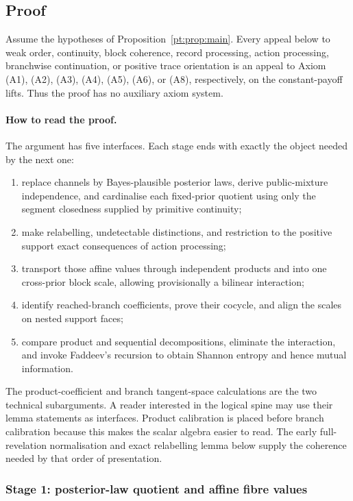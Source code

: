 \subsection{Proof}

Assume the hypotheses of Proposition~\ref{pt:prop:main}.  Every appeal below
to weak order, continuity, block coherence, record processing, action
processing, branchwise continuation, or positive trace orientation is an
appeal to Axiom \textup{(A1)}, \textup{(A2)}, \textup{(A3)}, \textup{(A4)},
\textup{(A5)}, \textup{(A6)}, or \textup{(A8)}, respectively, on the
constant-payoff lifts.  Thus the proof has no auxiliary axiom system.

\paragraph{How to read the proof.}
The argument has five interfaces.  Each stage ends with exactly the object
needed by the next one:
\begin{enumerate}[label=\textup{Stage \arabic*:},leftmargin=*]
\item replace channels by Bayes-plausible posterior laws, derive public-mixture
  independence, and cardinalise each fixed-prior quotient using only the
  segment closedness supplied by primitive continuity;
\item make relabelling, undetectable distinctions, and restriction to the
  positive support exact consequences of action processing;
\item transport those affine values through independent products and into one
  cross-prior block scale, allowing provisionally a bilinear interaction;
\item identify reached-branch coefficients, prove their cocycle, and align
  the scales on nested support faces;
\item compare product and sequential decompositions, eliminate the
  interaction, and invoke Faddeev's recursion to obtain Shannon entropy and
  hence mutual information.
\end{enumerate}
The product-coefficient and branch tangent-space calculations are the two
technical subarguments.  A reader interested in the logical spine may use
their lemma statements as interfaces.  Product calibration is
placed before branch calibration because this makes the scalar algebra easier
to read.  The early full-revelation normalisation and exact relabelling lemma
below supply the coherence needed by that order of presentation.

\subsubsection{Stage 1: posterior-law quotient and affine fibre values}

